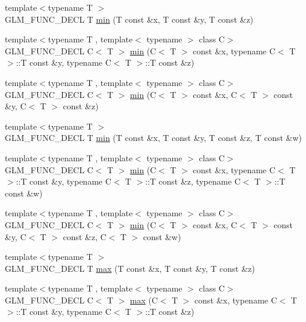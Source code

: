\begin{DoxyCompactItemize}
\item 
{\footnotesize template$<$typename T $>$ }\\G\+L\+M\+\_\+\+F\+U\+N\+C\+\_\+\+D\+E\+CL T \hyperlink{group__gtx__extented__min__max_ga713d3f9b3e76312c0d314e0c8611a6a6}{min} (T const \&x, T const \&y, T const \&z)
\item 
{\footnotesize template$<$typename T , template$<$ typename $>$ class C$>$ }\\G\+L\+M\+\_\+\+F\+U\+N\+C\+\_\+\+D\+E\+CL C$<$ T $>$ \hyperlink{group__gtx__extented__min__max_ga74d1a96e7cdbac40f6d35142d3bcbbd4}{min} (C$<$ T $>$ const \&x, typename C$<$ T $>$\+::T const \&y, typename C$<$ T $>$\+::T const \&z)
\item 
{\footnotesize template$<$typename T , template$<$ typename $>$ class C$>$ }\\G\+L\+M\+\_\+\+F\+U\+N\+C\+\_\+\+D\+E\+CL C$<$ T $>$ \hyperlink{group__gtx__extented__min__max_ga42b5c3fc027fd3d9a50d2ccc9126d9f0}{min} (C$<$ T $>$ const \&x, C$<$ T $>$ const \&y, C$<$ T $>$ const \&z)
\item 
{\footnotesize template$<$typename T $>$ }\\G\+L\+M\+\_\+\+F\+U\+N\+C\+\_\+\+D\+E\+CL T \hyperlink{group__gtx__extented__min__max_ga95466987024d03039607f09e69813d69}{min} (T const \&x, T const \&y, T const \&z, T const \&w)
\item 
{\footnotesize template$<$typename T , template$<$ typename $>$ class C$>$ }\\G\+L\+M\+\_\+\+F\+U\+N\+C\+\_\+\+D\+E\+CL C$<$ T $>$ \hyperlink{group__gtx__extented__min__max_ga4fe35dd31dd0c45693c9b60b830b8d47}{min} (C$<$ T $>$ const \&x, typename C$<$ T $>$\+::T const \&y, typename C$<$ T $>$\+::T const \&z, typename C$<$ T $>$\+::T const \&w)
\item 
{\footnotesize template$<$typename T , template$<$ typename $>$ class C$>$ }\\G\+L\+M\+\_\+\+F\+U\+N\+C\+\_\+\+D\+E\+CL C$<$ T $>$ \hyperlink{group__gtx__extented__min__max_ga7471ea4159eed8dd9ea4ac5d46c2fead}{min} (C$<$ T $>$ const \&x, C$<$ T $>$ const \&y, C$<$ T $>$ const \&z, C$<$ T $>$ const \&w)
\item 
{\footnotesize template$<$typename T $>$ }\\G\+L\+M\+\_\+\+F\+U\+N\+C\+\_\+\+D\+E\+CL T \hyperlink{group__gtx__extented__min__max_ga04991ccb9865c4c4e58488cfb209ce69}{max} (T const \&x, T const \&y, T const \&z)
\item 
{\footnotesize template$<$typename T , template$<$ typename $>$ class C$>$ }\\G\+L\+M\+\_\+\+F\+U\+N\+C\+\_\+\+D\+E\+CL C$<$ T $>$ \hyperlink{group__gtx__extented__min__max_gae1b7bbe5c91de4924835ea3e14530744}{max} (C$<$ T $>$ const \&x, typename C$<$ T $>$\+::T const \&y, typename C$<$ T $>$\+::T const \&z)

\end{DoxyCompactItemize}
